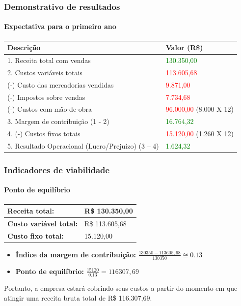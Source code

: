 \documentclass{beamer}
\begin{document}
\begin{frame}
  \frametitle{Demonstrativo de resultados}
  \framesubtitle{Expectativa para o primeiro ano}

  \begin{small}
    \begin{tabular}{| l | l |}
      \hline
      \textbf{Descrição} & \textbf{Valor (R\$)}\\ \hline
      1. Receita total com vendas & \textcolor{green}{130.350,00}\\ \hline \hline
      2. Custos variáveis totais & \textcolor{red}{113.605,68}\\ \hline
      (-) Custo das mercadorias vendidas & \textcolor{red}{9.871,00}\\ \hline
      (-) Impostos sobre vendas & \textcolor{red}{7.734,68} \\ \hline
      (-) Custos com mão-de-obra & \textcolor{red}{96.000,00} (8.000 X 12)\\ \hline \hline
      3. Margem de contribuição (1 - 2) & \textcolor{green}{16.764,32}\\ \hline \hline
      4. (-) Custos fixos totais & \textcolor{red}{15.120,00} (1.260 X 12)\\ \hline \hline
      5. Resultado Operacional (Lucro/Prejuízo) (3 – 4) & \textcolor{green}{1.624,32}\\ \hline
    \end{tabular}
  \end{small}
\end{frame}

\begin{frame}
  \frametitle{Indicadores de viabilidade}
  \framesubtitle{Ponto de equilíbrio}

  \begin{tabular}{| l | l |}
    \hline
    \textbf{Receita total:} & R\$ 130.350,00 \\ \hline
    \textbf{Custo variável total:} & R\$ 113.605,68 \\ \hline
    \textbf{Custo fixo total:} & 15.120,00 \\ \hline
  \end{tabular}

  \begin{itemize}
    \item \textbf{Índice da margem de contribuição:} $\frac{130350 - 113605,68}{130350} \cong 0.13$
    \item \textbf{Ponto de equilíbrio:} $\frac{15120}{0.13} = 116307,69$
  \end{itemize}

  Portanto, a empresa estará cobrindo seus custos a partir do momento em que atingir uma receita bruta total de R\$ 116.307,69.
\end{frame}
\end{document}

